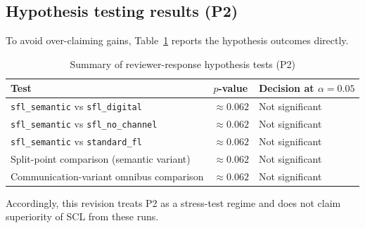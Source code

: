 \documentclass[10pt,journal]{IEEEtran}
\begin{document}
\subsection{Hypothesis testing results (P2)}
To avoid over-claiming gains, Table~\ref{tab:hypothesis_p2} reports the hypothesis outcomes directly.
\begin{table}[htbp]
\centering
\caption{Summary of reviewer-response hypothesis tests (P2)}
\label{tab:hypothesis_p2}
\footnotesize
\setlength{\tabcolsep}{4pt}
\begin{tabular}{p{}p{}p{}}
\toprule
\textbf{Test} & \textbf{$p$-value} & \textbf{Decision at $\alpha=0.05$} \\
\midrule
\texttt{sfl\_semantic} vs \texttt{sfl\_digital} & $\approx0.062$ & Not significant \\
\texttt{sfl\_semantic} vs \texttt{sfl\_no\_channel} & $\approx0.062$ & Not significant \\
\texttt{sfl\_semantic} vs \texttt{standard\_fl} & $\approx0.062$ & Not significant \\
Split-point comparison (semantic variant) & $\approx0.062$ & Not significant \\
Communication-variant omnibus comparison & $\approx0.062$ & Not significant \\
\bottomrule
\end{tabular}
\end{table}
Accordingly, this revision treats P2 as a stress-test regime and does not claim superiority of SCL from these runs.
\end{document}
